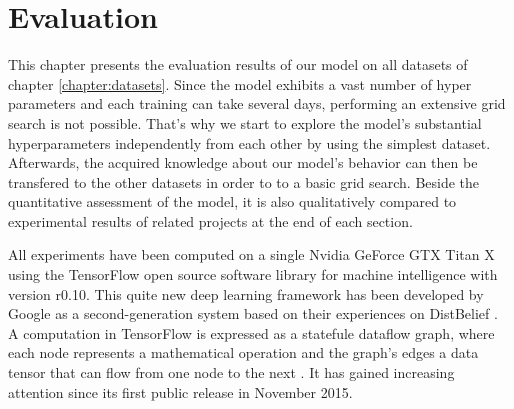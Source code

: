 




\chapter{Evaluation} \label{chapter:evaluation}

This chapter presents the evaluation results of our model on all datasets of chapter \ref{chapter:datasets}. Since the model exhibits a vast number of hyper parameters and each training can take several days, performing an extensive grid search is not possible. That's why we start to explore the model's substantial hyperparameters independently from each other by using the simplest dataset. Afterwards, the acquired knowledge about our model's behavior can then be transfered to the other datasets in order to to a basic grid search. Beside the quantitative assessment of the model, it is also qualitatively compared to experimental results of related projects at the end of each section.

All experiments have been computed on a single Nvidia GeForce GTX Titan X using the TensorFlow open source software library for machine intelligence with version r0.10. This quite new deep learning framework has been developed by Google as a second-generation system based on their experiences on DistBelief \parencite{distbelief}. A computation in TensorFlow is expressed as a statefule dataflow graph, where each node represents a mathematical operation and the graph's edges a data tensor that can flow from one node to the next \parencite{tensorflow2015-whitepaper}. It has gained increasing attention since its first public release in November 2015.

